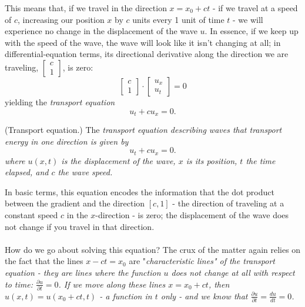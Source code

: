 \documentclass{article}
\begin{document}
This means that, if we travel in the direction $x = x_0 + ct$ - if we travel at a speed of $c$, increasing our position $x$ by $c$ units every 1 unit of time $t$ - we will experience no change in the displacement of the wave $u$. In essence, if we keep up with the speed of the wave, the wave will look like it isn't changing at all; in differential-equation terms, its directional derivative along the direction we are traveling, $\begin{bmatrix}
    c\\1
\end{bmatrix}$, is zero:
\begin{equation*}
        \begin{bmatrix}
            c\\1
        \end{bmatrix}\cdot \begin{bmatrix}
            u_x \\ u_t
        \end{bmatrix} = 0
\end{equation*}
yielding the \it transport equation\normalfont 
\begin{equation*}
    u_t+cu_x=0.
\end{equation*}
\begin{definition}
    (Transport equation.) The \it transport equation \normalfont describing waves that transport energy in one direction is given by \begin{equation*}
        u_t+cu_x=0.
    \end{equation*}
    where $u(x,t)$ is the displacement of the wave, $x$ is its position, $t$ the time elapsed, and $c$ the wave speed.
\end{definition}
In basic terms, this equation encodes the information that the dot product between the gradient and the direction $[c,1]$ - the direction of traveling at a constant speed $c$ in the $x$-direction - is zero; the displacement of the wave does not change if you travel in that direction.\\ \\
How do we go about solving this equation? The crux of the matter again relies on the fact that the lines $x-ct=x_0$ are "\it characteristic lines\normalfont" of the transport equation - they are lines where the function $u$ does not change at all with respect to time: $\frac{\partial u}{\partial t}=0$. If we move along these lines $x = x_0 + ct$, then $u(x,t)=u(x_0+ct, t)$ - a function in $t$ only - and we know that $\frac{\partial u}{\partial t}=\frac{du}{dt}=0$.\\ \\
\end{document}
